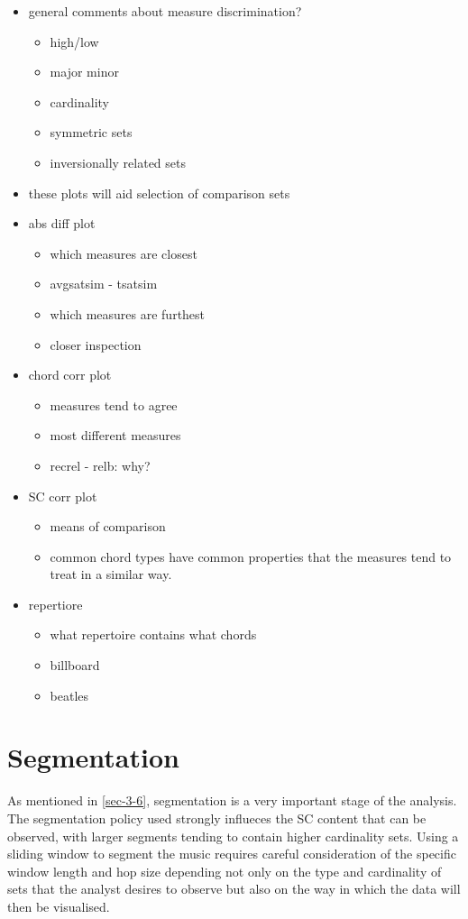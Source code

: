 \documentclass{article}
\begin{document}
\begin{itemize}
\item general comments about measure discrimination?
\begin{itemize}
\item high/low
\item major minor
\item cardinality
\item symmetric sets
\item inversionally related sets
\end{itemize}
\item these plots will aid selection of comparison sets
\item abs diff plot
\begin{itemize}
\item which measures are closest
\item avgsatsim - tsatsim
\item which measures are furthest
\item closer inspection
\end{itemize}
\item chord corr plot
\begin{itemize}
\item measures tend to agree
\item most different measures
\item recrel - relb: why?
\end{itemize}
\item SC corr plot
\begin{itemize}
\item means of comparison
\item common chord types have common properties that the measures tend
    to treat in a similar way.
\end{itemize}
\item repertiore
\begin{itemize}
\item what repertoire contains what chords
\item billboard
\item beatles
\end{itemize}
\end{itemize}
\section{Segmentation}
\label{sec-8}

As mentioned in \ref{sec-3-6}, segmentation is a very
important stage of the analysis. The segmentation policy used strongly
influeces the SC content that can be observed, with larger segments
tending to contain higher cardinality sets. Using a sliding window to
segment the music requires careful consideration of the specific
window length and hop size depending not only on the type and
cardinality of sets that the analyst desires to observe but also on
the way in which the data will then be visualised.
\end{document}
